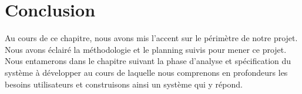 




\newpage

\section*{Conclusion}
Au cours de ce chapitre, nous avons mis l’accent sur le périmètre de notre projet. Nous avons éclairé
la méthodologie et le planning suivis pour mener ce projet. Nous entamerons dans le chapitre suivant
la phase d’analyse et spécification du système à développer au cours de laquelle nous comprenons en
profondeurs les besoins utilisateurs et construisons ainsi un système qui y répond.

